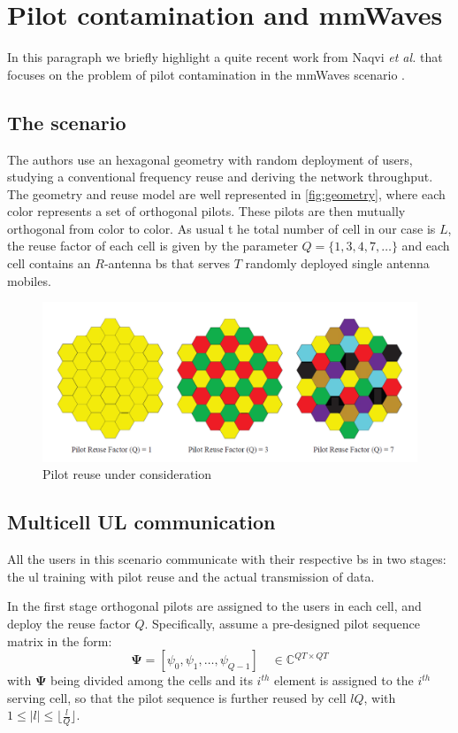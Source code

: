 \documentclass[11pt]{book}
\begin{document}
\section{Pilot contamination and mmWaves}
In this paragraph we briefly highlight a quite recent work from Naqvi \textit{et al.} that focuses on the problem of pilot contamination in the mmWaves scenario \cite{Ahsan2016}.
\subsection{The scenario}
The authors use an hexagonal geometry with random deployment of users, studying a conventional frequency reuse and deriving the network throughput. The geometry and reuse model are well represented in \autoref{fig:geometry}, where each color represents a set of orthogonal pilots. These pilots are then mutually orthogonal from color to color. As usual t  he total number of cell in our case is $L$, the reuse factor of each cell is given by the parameter $Q = \{1,3,4,7,\dots\}$ and each cell contains an $R$-antenna \gls{bs} that serves $T$ randomly deployed single antenna mobiles.
\begin{figure}
\centering
  \includegraphics[width = .7\textwidth]{geometry.png}
  \caption{Pilot reuse under consideration}
  \label{fig:geometry}
\end{figure}
\subsection{Multicell UL communication}
All the users in this scenario communicate with their respective \gls{bs} in two stages: the \gls{ul} training with pilot reuse and the actual transmission of data.

In the first stage orthogonal pilots are assigned to the users in each cell, and deploy the reuse factor $Q$. Specifically, assume a pre-designed pilot sequence matrix in the form:
\begin{equation}
  \mathbf{\Psi} = [\psi_0,\psi_1,\dots,\psi_{Q-1}] \quad \in \mathbb{C}^{QT\times QT}
\end{equation}
with $\mathbf{\Psi}$ being divided among the cells and its $i^{th}$ element is assigned to the $i^{th}$ serving cell, so that the pilot sequence is further reused by cell $lQ$, with $1 \leq |l| \leq \lfloor\frac{l}{Q}\rfloor$.
\end{document}
